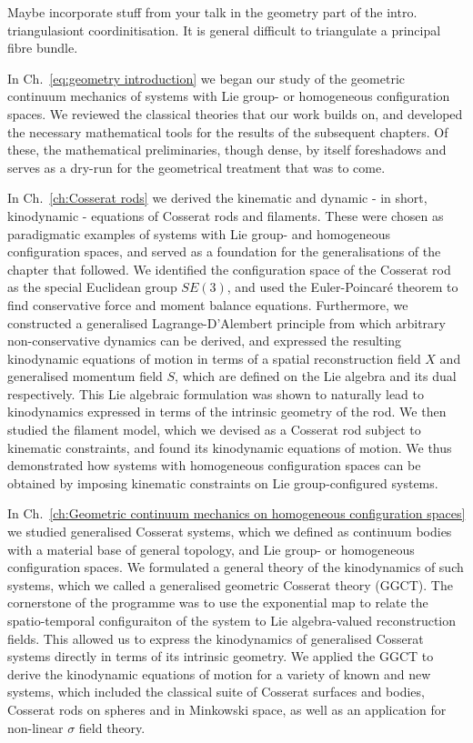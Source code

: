 \documentclass[]{cam-thesis}
\begin{document}
Maybe incorporate stuff from your talk in the geometry part of the intro. triangulasiont coordinitisation. It is general difficult to triangulate a principal fibre bundle.





In Ch.~\ref{eq:geometry introduction} we began our study of the geometric continuum mechanics of systems with Lie group- or homogeneous configuration spaces. We reviewed the classical theories that our work builds on, and developed the necessary mathematical tools for the results of the subsequent chapters. Of these, the mathematical preliminaries, though dense, by itself foreshadows and serves as a dry-run for the geometrical treatment that was to come.

In Ch.~\ref{ch:Cosserat rods} we derived the kinematic and dynamic - in short, kinodynamic - equations of Cosserat rods and filaments. These were chosen as paradigmatic examples of systems with Lie group- and homogeneous configuration spaces, and served as a foundation for the generalisations of the chapter that followed. We identified the configuration space of the Cosserat rod as the special Euclidean group $SE(3)$, and used the Euler-Poincaré theorem to find conservative force and moment balance equations. Furthermore, we constructed a generalised Lagrange-D'Alembert principle from which arbitrary non-conservative dynamics can be derived, and expressed the resulting kinodynamic equations of motion in terms of a spatial reconstruction field $X$ and generalised momentum field $S$, which are defined on the Lie algebra and its dual respectively. This Lie algebraic formulation was shown to naturally lead to kinodynamics expressed in terms of the intrinsic geometry of the rod. We then studied the filament model, which we devised as a Cosserat rod subject to kinematic constraints, and found its kinodynamic equations of motion. We thus demonstrated how systems with homogeneous configuration spaces can be obtained by imposing kinematic constraints on Lie group-configured systems.

In Ch.~\ref{ch:Geometric continuum mechanics on homogeneous configuration spaces} we studied generalised Cosserat systems, which we defined as continuum bodies with a material base of general topology, and Lie group- or homogeneous configuration spaces. We formulated a general theory of the kinodynamics of such systems, which we called a generalised geometric Cosserat theory (GGCT). The cornerstone of the programme was to use the exponential map to relate the spatio-temporal configuraiton of the system to Lie algebra-valued reconstruction fields. This allowed us to express the kinodynamics of generalised Cosserat systems directly in terms of its intrinsic geometry. We applied the GGCT to derive the kinodynamic equations of motion for a variety of known and new systems, which included the classical suite of Cosserat surfaces and bodies, Cosserat rods on spheres and in Minkowski space, as well as an application for non-linear $\sigma$ field theory.
\end{document}
